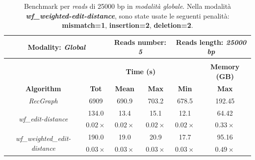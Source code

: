     \begin{table}[h]
        \centering
        \begin{tabular}{|c|c|c|c|c|c|}
            \hline
                \multicolumn{2}{|c|}{\textbf{Modality:} \emph{Global}} & \multicolumn{2}{|c|}{\textbf{Reads number: } \emph{5}} & \multicolumn{2}{|c|}{\textbf{Reads length:} \emph{25000 bp}} \\
            \hline
                \multicolumn{6}{|c|}{} \\
            \hline
                & \multicolumn{4}{|c|}{\textbf{Time (s)}} & \textbf{Memory (GB)} \\
            \hline
                \textbf{Algorithm} & \textbf{Tot} & \textbf{Mean} & \textbf{Max} & \textbf{Min} & \textbf{Max} \\
            \hline
                \emph{RecGraph} & 6909 & 690.9 & 703.2 & 678.5 & 192.45 \\
            \hline
                \multirow{2}{*}{\emph{wf\_edit-distance}} & 134.0 & 13.4 & 15.1 & 12.1 & 64.42 \\
                & $0.02 \times$ & $0.02  \times$ & $0.02 \times$ & $0.02 \times$ & $0.33 \times$ \\
            \hline
                \multirow{2}{*}{\emph{wf\_weighted\_edit-distance}} & 190.0 & 19.0 & 20.9 & 17.7 & 95.16 \\
                & $0.03 \times$ & $0.03  \times$ & $0.03 \times$ & $0.03 \times$ & $0.49 \times$ \\
            \hline
        \end{tabular}
        \caption{Benchmark per \emph{reads} di 25000 bp in \emph{modalità globale}. Nella modalità \textbf{\textit{wf\_weighted-edit-distance}}, sono state usate le seguenti penalità: \textbf{mismatch=1}, \textbf{insertion=2}, \textbf{deletion=2}.}
        \label{tab:benchmark_global_25k}
    \end{table}
    \vspace{20pt}
    
